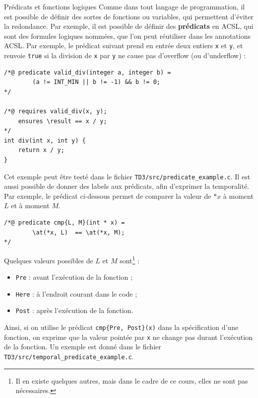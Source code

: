\documentclass{article}
\begin{document}
\begin{Memo}{Prédicats et fonctions logiques}{}
    Comme dans tout langage de programmation, il est possible de 
    définir des sortes de fonctions ou variables, qui permettent
    d'éviter la redondance.
    Par exemple, il est possible de définir des \textbf{prédicats}
    en ACSL, qui sont des formules logiques nommées, que l'on peut
    réutiliser dans les annotations ACSL.
    Par exemple, le prédicat suivant prend en entrée deux entiers \texttt{x} et \texttt{y}, 
    et renvoie \texttt{true} si la division de \texttt{x} par \texttt{y} ne cause
    pas d'overflow (ou d'underflow) :
    \begin{MeCode}
        \begin{lstlisting}[style=CStyle]
/*@ predicate valid_div(integer a, integer b) =
        (a != INT_MIN || b != -1) && b != 0;
*/

/*@ requires valid_div(x, y);
    ensures \result == x / y;
*/
int div(int x, int y) {
    return x / y;
}
        \end{lstlisting}
    \end{MeCode}

    Cet exemple peut être testé dans le fichier \texttt{TD3/src/predicate\_example.c}.
    Il est aussi possible de donner des labels aux prédicats, afin d'exprimer
    la temporalité.
    Par exemple, le prédicat ci-dessous permet de comparer la valeur de $*x$
    à moment $L$ et à moment $M$.

    \begin{MeCode}
        \begin{lstlisting}[style=CStyle]
/*@ predicate cmp{L, M}(int * x) =
        \at(*x, L)  == \at(*x, M);
*/\end{lstlisting}
    \end{MeCode}

    Quelques valeurs possibles de $L$ et $M$ sont\footnote{Il en existe quelques autres,
    mais dans le cadre de ce cours, elles ne sont pas nécessaires.} :
    \begin{itemize}[label=$\bullet$]
        \item \texttt{Pre} : avant l'exécution de la fonction ;
        \item \texttt{Here} : à l'endroit courant dans le code ;
        \item \texttt{Post} : après l'exécution de la fonction.
    \end{itemize}
    Ainsi, si on utilise le prédicat \texttt{cmp\{Pre, Post\}(x)} dans la spécification
    d'une fonction, on exprime que la valeur pointée par \texttt{x}
    ne change pas durant l'exécution de la fonction.
    Un exemple est donné dans le fichier \texttt{TD3/src/temporal\_predicate\_example.c}.


\end{Memo}
\end{document}

